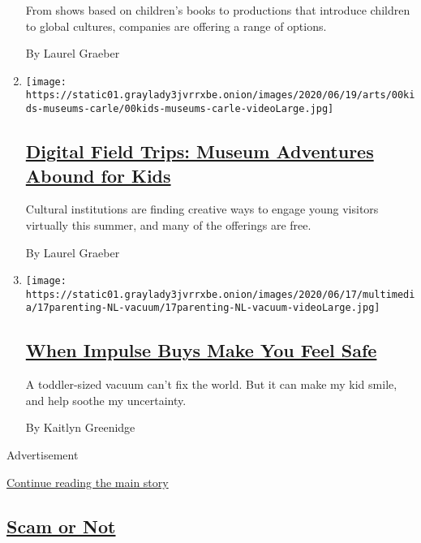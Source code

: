 \begin{enumerate}
  From shows based on children's books to productions that introduce
  children to global cultures, companies are offering a range of
  options.

  By Laurel Graeber
\item
  \texttt{[image: https://static01.graylady3jvrrxbe.onion/images/2020/06/19/arts/00kids-museums-carle/00kids-museums-carle-videoLarge.jpg]}

  \hypertarget{digital-field-trips-museum-adventures-abound-for-kids}{%
  \subsection{\texorpdfstring{\href{/2020/06/18/arts/design/kids-museums-summer-virus.html}{Digital
  Field Trips: Museum Adventures Abound for
  Kids}}{Digital Field Trips: Museum Adventures Abound for Kids}}\label{digital-field-trips-museum-adventures-abound-for-kids}}

  Cultural institutions are finding creative ways to engage young
  visitors virtually this summer, and many of the offerings are free.

  By Laurel Graeber
\item
  \texttt{[image: https://static01.graylady3jvrrxbe.onion/images/2020/06/17/multimedia/17parenting-NL-vacuum/17parenting-NL-vacuum-videoLarge.jpg]}

  \hypertarget{when-impulse-buys-make-you-feel-safe}{%
  \subsection{\texorpdfstring{\href{/2020/06/17/parenting/virus-impulse-buys.html}{When
  Impulse Buys Make You Feel
  Safe}}{When Impulse Buys Make You Feel Safe}}\label{when-impulse-buys-make-you-feel-safe}}

  A toddler-sized vacuum can't fix the world. But it can make my kid
  smile, and help soothe my uncertainty.

  By Kaitlyn Greenidge
\end{enumerate}

Advertisement

\protect\hyperlink{after-mid2}{Continue reading the main story}

\hypertarget{scam-or-not}{%
\subsection{\texorpdfstring{\href{/column/scam-or-not}{Scam or
Not}}{Scam or Not}}\label{scam-or-not}}

